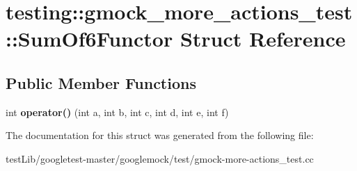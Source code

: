 \hypertarget{structtesting_1_1gmock__more__actions__test_1_1SumOf6Functor}{}\section{testing\+:\+:gmock\+\_\+more\+\_\+actions\+\_\+test\+:\+:Sum\+Of6\+Functor Struct Reference}
\label{structtesting_1_1gmock__more__actions__test_1_1SumOf6Functor}
\subsection*{Public Member Functions}
\begin{DoxyCompactItemize}
\item 
\mbox{\label{structtesting_1_1gmock__more__actions__test_1_1SumOf6Functor_adc0cc4dbd423db7298497b8a9630067e}} 
int {\bfseries operator()} (int a, int b, int c, int d, int e, int f)
\end{DoxyCompactItemize}


The documentation for this struct was generated from the following file\+:\begin{DoxyCompactItemize}
\item 
test\+Lib/googletest-\/master/googlemock/test/gmock-\/more-\/actions\+\_\+test.\+cc\end{DoxyCompactItemize}
